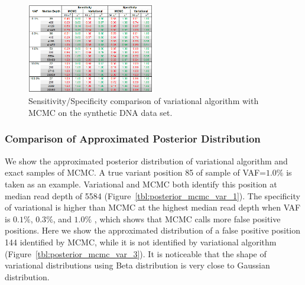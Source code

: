 \documentclass{article}
\begin{document}

\begin{figure}[h]
\centering
\vspace{-10pt}
\includegraphics[width=0.5\textwidth]{figs/statistics_mcmc_var.png}
\caption{Sensitivity/Specificity comparison of variational algorithm with MCMC on the synthetic DNA data set.}
\label{tbl:statistics_mcmc_var}
\end{figure}

\subsubsection{Comparison of Approximated Posterior Distribution}
We show the approximated posterior distribution of variational algorithm and exact samples of MCMC.
A true variant position 85 of sample of VAF=$1.0\%$ is taken as an example.
Variational and MCMC both identify this position at median read depth of 5584 (Figure~\ref{tbl:posterior_mcmc_var_1}).
The specificity of variational is higher than MCMC at the highest median read depth when VAF is $0.1\%$, $0.3\%$, and $1.0\%$ , which shows that MCMC calls more false positive positions.
Here we show the approximated distribution of a false positive position 144 identified by MCMC, while it is not identified by variational algorithm (Figure~\ref{tbl:posterior_mcmc_var_3}).
It is noticeable that the shape of variational distributions using Beta distribution is very close to Gaussian distribution.
\end{document}
